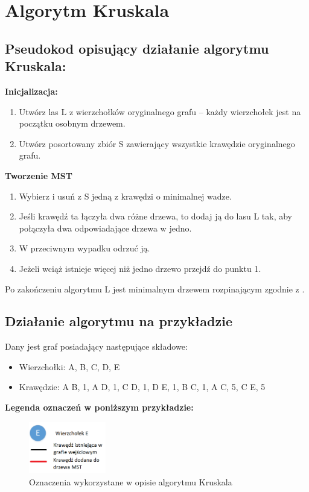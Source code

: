 \section{Algorytm Kruskala}
\subsection{Pseudokod opisujący działanie algorytmu Kruskala:}
\textbf{Inicjalizacja:}
\begin{enumerate}
	\item	Utwórz las L z wierzchołków oryginalnego grafu – każdy wierzchołek jest na początku osobnym drzewem.
	\item Utwórz posortowany zbiór S zawierający wszystkie krawędzie oryginalnego grafu.
\end{enumerate}

\begin{center}
	\textbf{Tworzenie MST}
\end{center}

\begin{enumerate}
\item Wybierz i usuń z S jedną z krawędzi o minimalnej wadze.
\item Jeśli krawędź ta łączyła dwa różne drzewa, to dodaj ją do lasu L tak, aby połączyła dwa odpowiadające drzewa w jedno.
\item W przeciwnym wypadku odrzuć ją.
\item Jeżeli wciąż istnieje więcej niż jedno drzewo przejdź do punktu 1.
\end{enumerate}

Po zakończeniu algorytmu L jest minimalnym drzewem rozpinającym zgodnie z \cite{gis}.

\newpage
\subsection{Działanie algorytmu na przykładzie}
Dany jest graf posiadający następujące składowe:
\begin{itemize}
\item Wierzchołki: {A}, {B}, {C}, {D}, {E}
\item Krawędzie: {A B, 1}, {A D, 1}, {C D, 1}, {D E, 1}, {B C, 1}, {A C, 5}, {C E, 5}
\end{itemize}

\textbf{Legenda oznaczeń w poniższym przykładzie:}\\
\begin{figure}[htb!]
	\centering
	\includegraphics[width=0.3\textwidth]{tex/fig/Picture1}
	\caption{Oznaczenia wykorzystane w opisie algorytmu Kruskala}
	\label{fig: legendK}
\end{figure}


